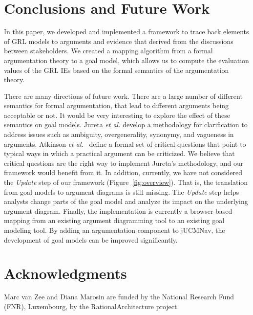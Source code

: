 \documentclass[11.5pt,two column]{llncs}
\begin{document}
\section{Conclusions and Future Work}
\label{sect:conclusion}

In this paper, we developed and implemented a framework to trace back elements of GRL models to arguments and evidence that derived from the discussions between stakeholders. We created a mapping algorithm from a formal argumentation theory to a goal model, which allows us to compute the evaluation values of the GRL IEs based on the formal semantics of the argumentation theory. 

There are many directions of future work. There are a large number of different semantics for formal argumentation, that lead to different arguments being acceptable or not. It would be very interesting to explore the effect of these semantics on goal models. Jureta \emph{et al.} develop a methodology for clarification to address issues such as ambiguity, overgenerality, synonymy, and vagueness in arguments. Atkinson \emph{et al.}~\cite{atkinson2007} define a formal set of critical questions that point to typical ways in which a practical argument can be criticized. We believe that critical questions are the right way to implement Jureta's methodology, and our framework would benefit from it. In addition, currently, we have not considered the \emph{Update} step of our framework (Figure~\ref{fig:overview}). That is, the translation from goal models to argument diagrams is still missing. The \emph{Update} step helps analysts change parts of the goal model and analyze its impact  on the underlying argument diagram. Finally, the implementation is currently a browser-based mapping from an existing argument diagramming tool to an existing goal modeling tool. By adding an argumentation component to jUCMNav, the development of goal models can be improved significantly. 

\section*{Acknowledgments}
Marc van Zee and Diana Marosin are funded by the National Research Fund (FNR), Luxembourg, by the  RationalArchitecture project.



\end{document}
